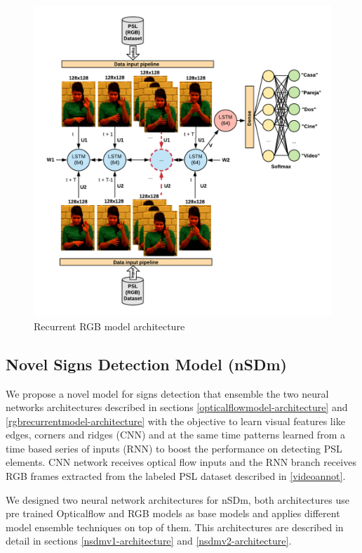\documentclass[twocolumn,conference]{article}
\begin{document}
\begin{figure}[hbt!]
\centering
\includegraphics[scale=0.8]{images/recurrent-rgb-model-architecture.png}
\caption{Recurrent RGB model architecture}
\label{fig:rgb-architecture}
\end{figure}

\subsection{Novel Signs Detection Model (nSDm)}\label{nsdm}
We propose a novel model for signs detection that ensemble the two neural networks architectures described in sections \ref{opticalflowmodel-architecture} and \ref{rgbrecurrentmodel-architecture} with the objective to learn visual features like edges, corners and ridges (CNN) and at the same time patterns learned from a time based series of inputs (RNN) to boost the performance on detecting PSL elements. CNN network receives optical flow inputs and the RNN branch receives RGB frames extracted from the labeled PSL dataset described in \ref{videoannot}.

We designed two neural network architectures for nSDm, both architectures use pre trained Opticalflow and RGB models as base models and applies different model ensemble techniques on top of them. This architectures are described in detail in sections \ref{nsdmv1-architecture} and \ref{nsdmv2-architecture}.
\end{document}
